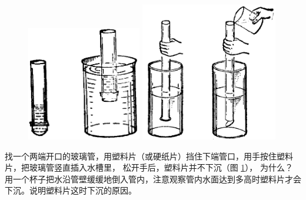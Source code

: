 \begin{figure}[htbp]
    \centering
    \begin{minipage}{5cm}
    \centering
    \includegraphics[width=5cm]{../pic/czwl1-ch5-21}
    \caption{}\label{fig:5-21}
    \end{minipage}
    \qquad
    \begin{minipage}{9cm}
    \centering
    \includegraphics[width=6cm]{../pic/czwl1-ch5-22}
    \caption{}\label{fig:5-22}
    \end{minipage}
\end{figure}



找一个两端开口的玻璃管，用塑料片（或硬纸片）挡住下端管口，用手按住塑料片，把玻璃管竖直插入水槽里，
松开手后，塑料片并不下沉（图 \ref{fig:5-22}）， 为什么？
用一个杯子把水沿管壁缓缓地倒入管内，注意观察管内水面达到多高时塑料片才会下沉。说明塑料片这时下沉的原因。


